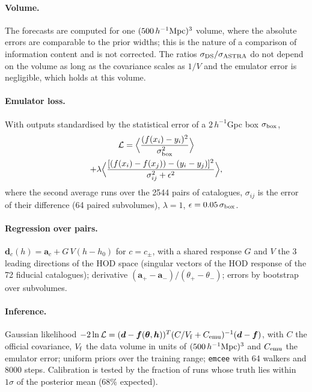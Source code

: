 \paragraph{Volume.} The forecasts are computed for one $(500\,h^{-1}\mathrm{Mpc})^3$ volume, where the absolute errors are comparable to the prior widths; this is the nature of a comparison of information content and is not corrected. The ratios $\sigma_{\rm DS}/\sigma_{\rm ASTRA}$ do not depend on the volume as long as the covariance scales as $1/V$ and the emulator error is negligible, which holds at this volume.

\paragraph{Emulator loss.} With outputs standardised by the statistical error of a $2\,h^{-1}$Gpc box $\sigma_{\rm box}$,
\begin{multline}
\mathcal L = \Big\langle \frac{(f(x_i) - y_i)^2}{\sigma_{\rm box}^2}\Big\rangle \\
+ \lambda \Big\langle \frac{[(f(x_i) - f(x_j)) - (y_i - y_j)]^2}{\sigma_{ij}^2 + \epsilon^2}\Big\rangle,
\end{multline}
where the second average runs over the 2544 pairs of catalogues, $\sigma_{ij}$ is the error of their difference (64 paired subvolumes), $\lambda=1$, $\epsilon=0.05\,\sigma_{\rm box}$.

\paragraph{Regression over pairs.} $\boldsymbol d_c(h) = \boldsymbol a_c + G\,V(h-h_0)$ for $c=c_\pm$, with a shared response $G$ and $V$ the 3 leading directions of the HOD space (singular vectors of the HOD response of the 72 fiducial catalogues); derivative $(\boldsymbol a_+-\boldsymbol a_-)/(\theta_+-\theta_-)$; errors by bootstrap over subvolumes.

\paragraph{Inference.} Gaussian likelihood $-2\ln\mathcal L = (\boldsymbol d - \boldsymbol f(\boldsymbol\theta,\boldsymbol h))^T (C/V_{\rm f} + C_{\rm emu})^{-1}(\boldsymbol d - \boldsymbol f)$, with $C$ the official covariance, $V_{\rm f}$ the data volume in units of $(500\,h^{-1}\mathrm{Mpc})^3$ and $C_{\rm emu}$ the emulator error; uniform priors over the training range; \texttt{emcee} with 64 walkers and 8000 steps. Calibration is tested by the fraction of runs whose truth lies within $1\sigma$ of the posterior mean (68\% expected).


